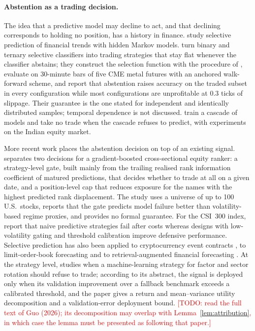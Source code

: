 \documentclass[11pt]{article}
\theoremstyle{remark}
\newcommand{\todo}[1]{\textcolor{red}{[TODO: #1]}}
\begin{document}
\paragraph{Abstention as a trading decision.}
The idea that a predictive model may decline to act, and that declining corresponds to holding
no position, has a history in finance. \citet{pidan2011selective} study selective prediction of
financial trends with hidden Markov models. \citet{chalkidis2021trading} turn binary and ternary
selective classifiers into trading strategies that stay flat whenever the classifier abstains;
they construct the selection function with the procedure of \citet{geifman2017selective},
evaluate on 30-minute bars of five CME metal futures with an anchored walk-forward scheme, and
report that abstention raises accuracy on the traded subset in every configuration while most
configurations are unprofitable at 0.3 ticks of slippage. Their guarantee is the one stated for
independent and identically distributed samples; temporal dependence is not discussed.
\citet{nabar2023conservative} train a cascade of models and take no trade when the cascade
refuses to predict, with experiments on the Indian equity market.

More recent work places the abstention decision on top of an existing signal.
\citet{sanderink2026alpha} separates two decisions for a gradient-boosted cross-sectional equity
ranker: a strategy-level gate, built mainly from the trailing realised rank information
coefficient of matured predictions, that decides whether to trade at all on a given date, and a
position-level cap that reduces exposure for the names with the highest predicted rank
displacement. The study uses a universe of up to 100 U.S.\ stocks, reports that the gate predicts
model failure better than volatility-based regime proxies, and provides no formal guarantee.
For the CSI~300 index, \citet{fang2026volatility} report that naive predictive strategies fail
after costs whereas designs with low-volatility gating and threshold calibration improve
defensive performance. Selective prediction has also been applied to cryptocurrency event
contracts \citep{hao2026coverage}, to limit-order-book forecasting \citep{manoharan2026uqlob} and
to retrieval-augmented financial forecasting \citep{torres2026finabstain}. At the strategy
level, \citet{guo2026whennot} studies when a machine-learning strategy for factor and sector
rotation should refuse to trade; according to its abstract, the signal is deployed only when its
validation improvement over a fallback benchmark exceeds a calibrated threshold, and the paper
gives a return and mean--variance utility decomposition and a validation-error deployment bound.
\todo{read the full text of Guo (2026); its decomposition may overlap with
Lemma~\ref{lem:attribution}, in which case the lemma must be presented as following that paper.}
\end{document}
